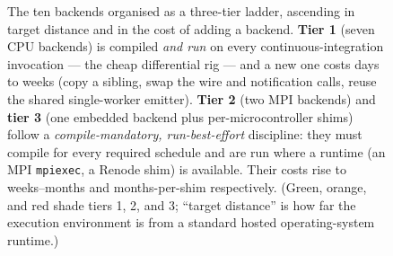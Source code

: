 \begin{figure}[tbp]
  \caption[The three-tier target ladder]{The ten backends organised as a
    three-tier ladder, ascending in target distance and in the cost of adding a
    backend. \textbf{Tier 1} (seven CPU backends) is compiled \emph{and run} on
    every continuous-integration invocation --- the cheap differential rig ---
    and a new one costs days to weeks (copy a sibling, swap the wire and
    notification calls, reuse the shared single-worker emitter). \textbf{Tier 2}
    (two MPI backends) and \textbf{tier 3} (one embedded backend plus
    per-microcontroller shims) follow a \emph{compile-mandatory, run-best-effort}
    discipline: they must compile for every required schedule and are run where a
    runtime (an MPI \texttt{mpiexec}, a Renode shim) is available. Their costs
    rise to weeks--months and months-per-shim respectively. (Green, orange, and
    red shade tiers 1, 2, and 3; ``target distance'' is how far the execution
    environment is from a standard hosted operating-system runtime.)}
  \label{fig:target-ladder}
\end{figure}
